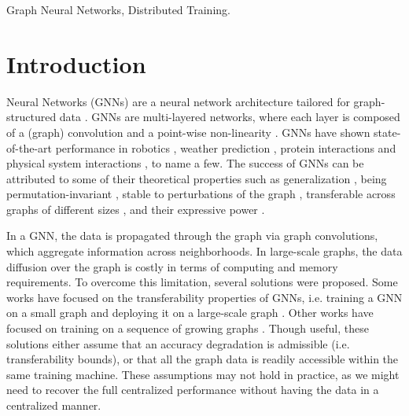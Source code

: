 \documentclass[lettersize,journal]{IEEEtran}
\begin{document}
\begin{IEEEkeywords}
Graph Neural Networks, Distributed Training.  
\end{IEEEkeywords}

\section{Introduction}
 Neural Networks (GNNs) are a neural network architecture tailored for graph-structured data \cite{zhou2020graph,wu2020comprehensive,bronstein2017geometric}. GNNs are multi-layered networks, where each layer is composed of a (graph) convolution and a point-wise non-linearity \cite{gama2018convolutional}.
GNNs have shown state-of-the-art performance in robotics \cite{gama2020decentralized,tzes2023graph}, weather prediction \cite{lam2022graphcast}, protein interactions \cite{jumper2021highly} and physical system interactions \cite{fortunato2022multiscale}, to name a few. The success of GNNs can be attributed to some of their theoretical properties such as generalization \cite{NEURIPS2022_1eeaae7c,2024arXiv240605225W},  being permutation-invariant \cite{keriven2019universal,satorras2021n}, stable to perturbations of the graph \cite{gama2020stability}, transferable across graphs of different sizes \cite{ruiz2020graphon}, and their expressive power \cite{xu2018powerful,bouritsas2022improving,kanatsoulis2022graph,chen2019equivalence}. 

In a GNN, the data is propagated through the graph via graph convolutions, which aggregate information across neighborhoods. In large-scale graphs, the data diffusion over the graph is costly in terms of computing and memory requirements. To overcome this limitation, several solutions were proposed. Some works have focused on the transferability properties of GNNs, i.e. training a GNN on a small graph and deploying it on a large-scale graph \cite{ruiz2020graphon,maskey2023transferability}. Other works have focused on training on a sequence of growing graphs \cite{cervino2023learning,10094894}. Though useful, these solutions either assume that an accuracy degradation is admissible (i.e. transferability bounds), or that all the graph data is readily accessible within the same training machine. These assumptions may not hold in practice, as we might need to recover the full centralized performance without having the data in a centralized manner.
\end{document}
